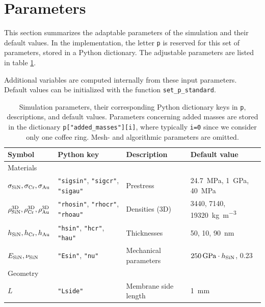 \section{Parameters}

This section summarizes the adaptable parameters of the simulation and their default values. In the implementation, the letter \texttt{p} is reserved for this set of parameters, stored in a Python dictionary. The adjustable parameters are listed in table \ref{tab:parameters}.  

Additional variables are computed internally from these input parameters. Default values can be initialized with the function \texttt{set\_p\_standard}.\\

\newpage 

\begin{table}[h]
    \centering
    \caption{Simulation parameters, their corresponding Python dictionary keys in \texttt{p}, descriptions, and default values. Parameters concerning added masses are stored in the dictionary \texttt{p["added\_masses"][i]}, where typically \texttt{i=0} since we consider only one coffee ring. Mesh- and algorithmic parameters are omitted.}
    \label{tab:parameters}
    \renewcommand{\arraystretch}{1.8}
    \begin{tabular}{llll}
        \textbf{Symbol} & \textbf{Python key} & \textbf{Description} & \textbf{Default value} \\
        \hline
        Materials&    &   &  \\
        $\sigma_{\mathrm{SiN}},\sigma_{\mathrm{Cr}},\sigma_{\mathrm{Au}}$     & \texttt{"sigsin"}, \texttt{"sigcr"}, \texttt{"sigau"} & Prestress & \SI{24.7}{\mega\pascal}, \SI{1}{\giga\pascal}, \SI{40}{\mega\pascal}  \\
        $\rho_{\mathrm{SiN}}^\mathrm{3D},\rho_{\mathrm{Cr}}^\mathrm{3D},\rho_{\mathrm{Au}}^\mathrm{3D}$  & \texttt{"rhosin"}, \texttt{"rhocr"}, \texttt{"rhoau"} & Densities (3D) & \SI{3440}{}, \SI{7140}{}, \SI{19320}{\kilogram\per\cubic\meter} \\
        $h_{\mathrm{SiN}},h_{\mathrm{Cr}},h_{\mathrm{Au}}$  & \texttt{"hsin"}, \texttt{"hcr"}, \texttt{"hau"} & Thicknesses & \SI{50}{}, \SI{10}{}, \SI{90}{\nano\meter} \\
        $E_{\mathrm{SiN}},\nu_{\mathrm{SiN}}$  & \texttt{"Esin"}, \texttt{"nu"} & Mechanical parameters & $\SI{250}{\giga\pascal}\cdot h_{\mathrm{SiN}}$, 0.23 \\
        Geometry&    &   &  \\
        $L$  & \texttt{"Lside"} & Membrane side length & \SI{1}{\milli\meter} \\

\end{tabular}
\end{table}
